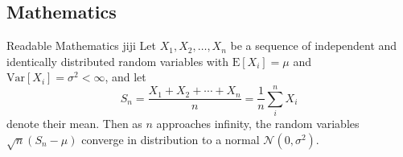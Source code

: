 \documentclass[12pt]{beamer}
\begin{document}
\subsection{Mathematics}
\begin{frame}{Readable Mathematics}
jiji
Let $X_1, X_2, \ldots, X_n$ be a sequence of independent and identically distributed random variables with $\text{E}[X_i] = \mu$ and $\text{Var}[X_i] = \sigma^2 < \infty$, and let
$$S_n = \frac{X_1 + X_2 + \cdots + X_n}{n}
      = \frac{1}{n}\sum_{i}^{n} X_i$$
denote their mean. Then as $n$ approaches infinity, the random variables $\sqrt{n}(S_n - \mu)$ converge in distribution to a normal $\mathcal{N}(0, \sigma^2)$.

\end{frame}
\end{document}
